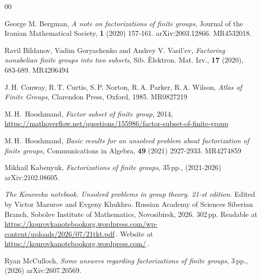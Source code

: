 \documentclass{amsart}
\numberwithin{equation}{section}
\numberwithin{theorem}{section}
\begin{document}
\begin{thebibliography}{00}

 George M. Bergman,
{\em A note on factorizations of finite groups},
Journal of the Iranian Mathematical Society, {\bf 1} (2020) 157-161.
arXiv:2003.12866. MR4532018.

 Ravil Bildanov, Vadim Goryachenko and Andrey V. Vasil’ev,
{\em Factoring nonabelian finite groups into two subsets},
Sib. Èlektron. Mat. Izv., {\bf 17} (2020), 683-689.
MR4206494

 J.\,H. Conway, R.\,T. Curtis, S.\,P. Norton,
R.\,A. Parker, R.\,A. Wilson, {\em Atlas of Finite Groups},
Clarendon Press, Oxford, 1985. MR0827219

 M.\,H.\ Hooshmand,
{\em Factor subset of finite group,} 2014,
\url{https://mathoverflow.net/questions/155986/factor-subset-of-finite-group}

 M.\,H.\ Hooshmand,
{\em Basic results for an unsolved problem about factorization of finite
groups,} Communications in Algebra,
{\bf 49} (2021) 2927-2933.
MR4274859

 Mikhail Kabenyuk,
{\em Factorizations of finite groups,} 35\,pp.,
(2021-2026) arXiv:2102.08605.

{\em The Kourovka notebook.
Unsolved problems in group theory.
21-st edition.}
Edited by Victor Mazurov and Evgeny Khukhro.
Russian Academy of Sciences Siberian Branch, Sobolev Institute of
Mathematics, Novosibirsk, 2026.
302\,pp.
Readable at
\url{https://kourovkanotebookorg.wordpress.com/wp-content/uploads/2026/07/21tkt.pdf}\,.
Website at \url{https://kourovkanotebookorg.wordpress.com/}\,.

 Ryan McCulloch,
{\em Some answers regarding factorizations of finite groups}, 3\,pp.,
(2026) arXiv:2607.20569.



\end{thebibliography}
\end{document}
